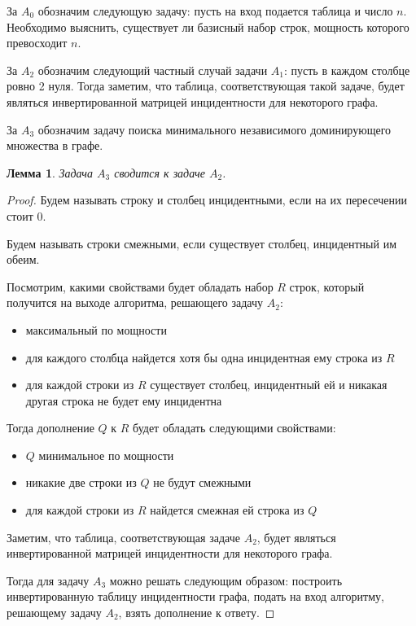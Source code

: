 \documentclass[a4paper,14pt]{extreport}
\newtheorem{lm}{Лемма}
\begin{document}
За $A_0$ обозначим следующую задачу: пусть на вход подается таблица и число $n$. Необходимо выяснить, существует ли базисный набор строк, мощность которого превосходит $n$.

За $A_2$ обозначим следующий частный случай задачи $A_1$: пусть в каждом столбце ровно 2 нуля. Тогда заметим, что таблица, соответствующая такой задаче, будет являться инвертированной матрицей инцидентности для некоторого графа.

За $A_3$ обозначим задачу поиска минимального независимого доминирующего множества в графе.

\begin{lm}
Задача $A_3$ сводится к задаче $A_2$.
\end{lm}
\begin{proof}
Будем называть строку и столбец инцидентными, если на их пересечении стоит 0. 

Будем называть строки смежными, если существует столбец, инцидентный им обеим.

Посмотрим, какими свойствами будет обладать набор $R$ строк, который получится на выходе алгоритма, решающего задачу $A_2$:
\begin{itemize}
\item максимальный по мощности    
\item для каждого столбца найдется хотя бы одна инцидентная ему строка из $R$
\item для каждой строки из $R$ существует столбец, инцидентный ей и никакая другая строка не будет ему инцидентна     
\end{itemize}

Тогда дополнение $Q$ к $R$ будет обладать следующими свойствами:
\begin{itemize}
\item $Q$ минимальное по мощности    
\item никакие две строки из $Q$ не будут смежными
\item для каждой строки из $R$ найдется смежная ей строка из $Q$     
\end{itemize}

Заметим, что таблица, соответствующая задаче $A_2$, будет являться инвертированной матрицей инцидентности для некоторого графа.

Тогда для задачу $A_3$ можно решать следующим образом: построить инвертированную таблицу инцидентности графа, подать на вход алгоритму, решающему задачу $A_2$, взять дополнение к ответу.
\end{proof}
\end{document}
